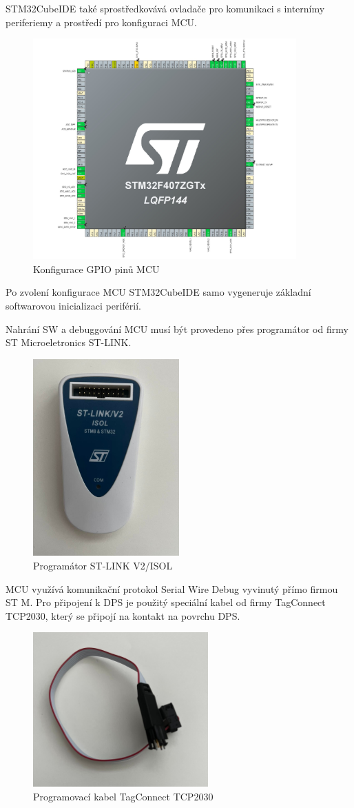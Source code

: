STM32CubeIDE také sprostředkovává ovladače pro komunikaci s internímy periferiemy a prostředí pro konfiguraci MCU.
\begin{figure}[H]
    \caption{Konfigurace GPIO pinů MCU}
    \includegraphics[width=0.9\textwidth]{pictures/mcu_settings.jpg}
\end{figure}
Po zvolení konfigurace MCU STM32CubeIDE samo vygeneruje základní softwarovou inicializaci periférií.
\par
Nahrání SW a debuggování MCU musí být provedeno přes programátor od firmy ST Microeletronics ST-LINK.
\begin{figure}[H]
    \caption{Programátor ST-LINK V2/ISOL}
    \includegraphics[width=0.5\textwidth]{pictures/stlink.jpg}
\end{figure}
MCU využívá komunikační protokol Serial Wire Debug vyvinutý přímo firmou ST M. Pro připojení k DPS je použitý speciální kabel od firmy TagConnect TCP2030, který se připojí na kontakt na povrchu DPS.
\begin{figure}[H]
    \caption{Programovací kabel TagConnect TCP2030}
    \includegraphics[width=0.6\textwidth]{pictures/tcp2030.jpg}
\end{figure}
